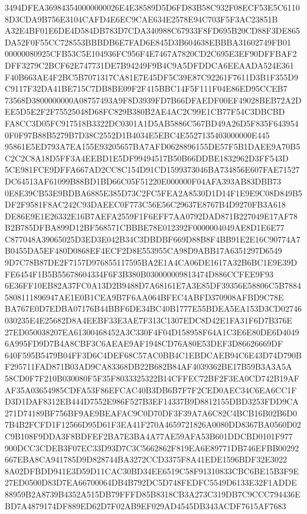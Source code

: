 \documentclass[UTF8,fontset=fandol,zihao=-4,a4paper]{ctexart}
\begin{document}
{{3494DFEA369843540000000026E4E38589D5D6FD83B58C932F08ECF53E5C61108D3CDA9B756E3104CAFD4E6EC9CAE634E2578E94C703F5F3AC23851B
A32E4BF01E6DE4D584DB783D7CDA340988C67933F8FD695B20CD88F3DE865DA52F0F55CC728553BBBDB6E7FAD6E845D3B604638EBBBA31602749FB01
00000080925CFB53C5E104936FC956F4E7467A7820CD2C695E3EF90DFFBAF2DFF3279C2BCF62E747731DE7B94249F9B4C9A5DFDDCA6EEAADA524E361
F40B663AE4F2BC5B7071317CA81E7E45DF5C39E87C92261F7611D3B1F355D9C9117F32DA41BE715C7DB8BE09F2F415BBC14F5F111F04E86ED95CCEB7
73568D3800000000A08757493A9F8D3939FD7B66DFAEDF00EF49028BEB72A2DEE5D5E2F2F75525048D68FC829B380B2AE4AC2C99E1CB77F54C3DBCBD
FA8CC3D05FC917518B3322DC0301A1D5AB5886C567BD49A26D5F835F6439540F0F97B88B5279B7D38C2552D1B4034E5EBC4E5527135403000000E445
95861E5ED793A7EA155E93205657BA7AFD0628896155DE57F5B1DAEE9A70B5C2C2C8A18D5FF3A4EEBD1E5DF99494517B50B66DDBE1832962D3FF543D
5CE981FCE9DFFA667AD2CC8C154D91CD1599373046BA734856E607FAE71527DC64513AF61099B88BD1BD66C05F51220E000000F04AFA393AB83DBB73
0E8E39CB53E9BDBA6885E385D73C2FC5FEA2A8530D1D14F1E9E9C08D849B5DF2F9581F8AC242C93DAEEC0F773C56E56C29637E8767B4D9270FB3A618
DE86E9E1E26332E16B7AEFA2559F1F6EFF7AA0792DAD871B227049E17AF78B2B785DFBA899D12BF568571CBBBE78E012392F0000004049AE8D1E6E77
C877048A39065025D3ED3E042B34C3DBDBF669D88B8F4BB91E2E16C90774A7B0455DA5EF480D0868EF4ECF2D8E553955CA98D9ABB17A6351297D6549
9D7C78B87DE2F7157D976855117595BA2E1A4CA06DE1617A32B6BC1E9E39DFE6454F1B5B55678604334F6F3B380B030000009813474D886CCFEE9F93
6E36FF10EB82A37FC0A13D2B9488D7A68161E7A3E85DF39356E58806C5B78845808111896947AE1E0B1CEA9B7F6AA064BFEC4ABFD370908AFBD9C78E
BA767E0D7EDBA07176B44BBF6DE34BC40B1777E55BDEA5EA153D3CD02746030235E4E25682D8A4EEBF33E3AE7F313C1307EDC8D42E1FA31F6D7B376E
27ED050038207EA61300468452A3C330F4F04D158958F64A1C3E6E80DE6D40496A995FD9D7B4A8CBF3C6AEAE9AF1948CD76A80E53DEF3D86626669DF
640F595B5479B04FF3D6C4DEF68C57AC0BB4C1EBDCAEB94C6E43D74D790BF295711FAD871B03AD9CA83368DB22B682B84AF4039362BE17B59B3A3A5A
58CD0F7F210B030080F5F35F8033325322B14CFFEC72BF2F3EA0CD742B19AFAF35A03654985CDFA53F86EFCAC40B3DB6B7F7F2CED0AEC34C6EA6CC1F
D3D1DAF8312EB444D7552E986F527B3EF14337B9D8812155DBD3253FDD9CA271D74189BF756BF9AE9BEAFAC9C0D70DF3F39A7A6C82C4BCB16B02B6D0
7B4B2FCFD1F12566D95D61F3EA41F270A4659721826A0080DD8367BA0560D02C9B108F9DDA3F8BDFEF2BA7E3BA4A77AE59AFA53B601DDCBD0101F977
900DCC3CDEB3F07EC33D93D7C3C5662862F819EA6E89771DB746EFBB00292667EBA8CA941785D9D828744BA3272CCD3375F8A41EDE1596BDF32E3022
8A02DFBDD941E3D59D11CAC30BD34EE6519C58F91310833CBC6BE15B3F9E27ED0500D83D7EA66700064DB4B792DC5D748FEDFC5549D6133E32F1ADDE
88959B2A8739B4352A515DB79FFFD85B8318CB3A273C319DB7C9CCC794436EBD7A4879174DF889ED62D7F02AB9EF029AD4545DB343ACDF7615AF7683
}}
\end{document}
